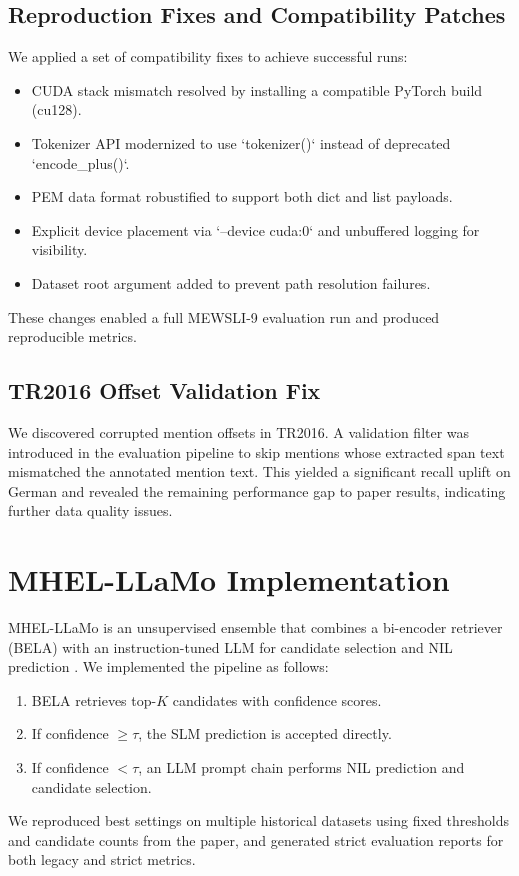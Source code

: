 \subsection{Reproduction Fixes and Compatibility Patches}
We applied a set of compatibility fixes to achieve successful runs:
\begin{itemize}
    \item CUDA stack mismatch resolved by installing a compatible PyTorch build (cu128).
    \item Tokenizer API modernized to use `tokenizer()` instead of deprecated `encode_plus()`.
    \item PEM data format robustified to support both dict and list payloads.
    \item Explicit device placement via `--device cuda:0` and unbuffered logging for visibility.
    \item Dataset root argument added to prevent path resolution failures.
\end{itemize}
These changes enabled a full MEWSLI-9 evaluation run and produced reproducible metrics.

\subsection{TR2016 Offset Validation Fix}
We discovered corrupted mention offsets in TR2016. A validation filter was introduced in the evaluation pipeline to skip mentions whose extracted span text mismatched the annotated mention text. This yielded a significant recall uplift on German and revealed the remaining performance gap to paper results, indicating further data quality issues.

\section{MHEL-LLaMo Implementation}
MHEL-LLaMo is an unsupervised ensemble that combines a bi-encoder retriever (BELA) with an instruction-tuned LLM for candidate selection and NIL prediction \cite{mhelllamo2026}. We implemented the pipeline as follows:
\begin{enumerate}
    \item BELA retrieves top-$K$ candidates with confidence scores.
    \item If confidence $\ge \tau$, the SLM prediction is accepted directly.
    \item If confidence $< \tau$, an LLM prompt chain performs NIL prediction and candidate selection.
\end{enumerate}
We reproduced best settings on multiple historical datasets using fixed thresholds and candidate counts from the paper, and generated strict evaluation reports for both legacy and strict metrics.


